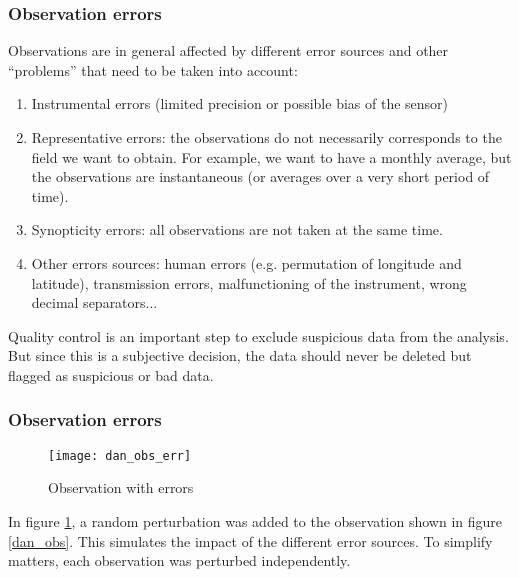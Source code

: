 
\begin{frame}
\frametitle{Observation errors}

Observations are in general affected by different error sources and
other ``problems'' that need to be taken into account:

\begin{enumerate}
\item Instrumental errors (limited precision or possible bias of the
  sensor)
\item Representative errors: the observations do not necessarily
  corresponds to the field we want to obtain. For example, we want to
  have a monthly average, but the observations are instantaneous (or
  averages over a very short period of time).
\item Synopticity errors: all observations are not taken at the same time.
\item Other errors sources: human errors (e.g. permutation of
  longitude and latitude), transmission errors, malfunctioning of the
  instrument, wrong decimal separators...
\end{enumerate}

Quality control is an important step to exclude suspicious data from
the analysis. But since this is a subjective decision, the data should
never be deleted but flagged as suspicious or bad data.

\end{frame}


\begin{frame}
\frametitle{Observation errors}

\begin{figure}[H] 
\centerline{\texttt{[image: dan\_obs\_err]}}
\caption{Observation with errors}
\label{dan_obs_err}
\end{figure}

\vspace{-1cm}

In figure \ref{dan_obs_err}, a random perturbation was added to the
observation shown in figure \ref{dan_obs}. This simulates the impact
of the different error sources. To simplify matters, each observation
was perturbed independently.\\

\end{frame}

